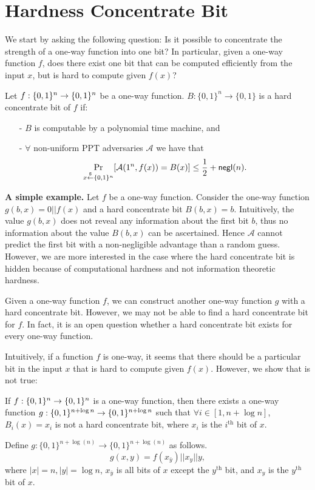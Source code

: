 \documentclass[12pt]{tufte-book}
\begin{document}
\section{Hardness Concentrate Bit}
We start by asking the following question: Is it possible to concentrate the strength of a one-way function into one bit? In particular, given a one-way function $f$, does there exist one bit that can be computed efficiently from the input $x$, but is hard to compute given $f(x)$?
\begin{definition}
Let $f:\{0,1\}^{n} \rightarrow \{0,1\}^{n}$ be a one-way function.
$B:\{0,1\}^n \rightarrow \{0,1\}$ is a hard concentrate bit of $f$ if:
\begin{itemize}
\item[-] $B$ is computable by a polynomial time machine, and
\item[-] $\forall$ non-uniform PPT adversaries $\mathcal{A}$ we have that
	$$\Pr_{x\stackrel{\$}{\leftarrow} \{0,1\}^{n}}[\mathcal{A}(1^n, f(x)) = B(x)] \leq \frac{1}{2} + \mathsf{negl}(n).$$
\end{itemize}
\end{definition}

\noindent\textbf{A simple example.}
Let $f$ be a one-way function. Consider the one-way function $g(b, x) = 0 || f(x)$ and a hard concentrate bit $B(b, x) = b$.
Intuitively, the value $g(b, x)$ does not reveal any information about the first bit $b$, thus no information about the value $B(b, x)$ can be ascertained. Hence $\mathcal{A}$ cannot predict the first bit with a non-negligible advantage than a random guess. However, we are more interested in the case where the hard concentrate bit is hidden because of computational hardness and not information theoretic hardness.

\bigskip
\begin{remark}
Given a one-way function $f$, we can construct another one-way function $g$ with a hard concentrate bit. However, we may not be able to find a hard concentrate bit for $f$. In fact, it is an open question whether a hard concentrate bit exists for every one-way function.
\end{remark}

\bigskip
Intuitively, if a function $f$ is one-way, it seems that there should be a particular bit in the input $x$ that is hard to compute given $f(x)$. However, we show that is not true:
\begin{claim}
If $f:\{0,1\}^{n}\rightarrow \{0,1\}^{n}$ is a one-way function, then there exists a one-way function $g:\{0,1\}^{n+\log n}\rightarrow\{0,1\}^{n+\log n}$ such that $\forall i \in [1, n+\log n]$, $B_i(x) = x_i$ is not a hard concentrate bit, where $x_i$ is the $i^\text{th}$ bit of $x$.
\end{claim}
\proof
Define $g:\{0,1\}^{n+\log(n)} \rightarrow \{0,1\}^{n+\log(n)}$ as follows.
$$g(x,y) = f(x_{\bar y}) || x_y || y,$$
where $|x| = n, |y| = \log n$, $x_{\bar y}$ is all bits of $x$ except the $y^\text{th}$ bit, and $x_y$ is the $y^\text{th}$ bit of $x$.
\end{document}
